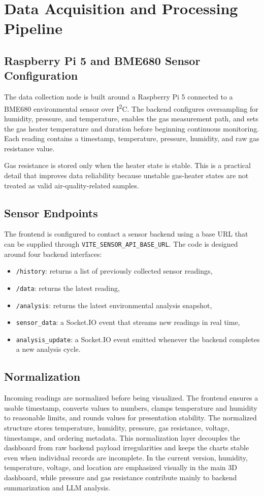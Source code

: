 \documentclass[conference]{IEEEtran}
\begin{document}
\section{Data Acquisition and Processing Pipeline}
\subsection{Raspberry Pi 5 and BME680 Sensor Configuration}
The data collection node is built around a Raspberry Pi 5 connected to a BME680 environmental sensor over I\textsuperscript{2}C. The backend configures oversampling for humidity, pressure, and temperature, enables the gas measurement path, and sets the gas heater temperature and duration before beginning continuous monitoring. Each reading contains a timestamp, temperature, pressure, humidity, and raw gas resistance value.

Gas resistance is stored only when the heater state is stable. This is a practical detail that improves data reliability because unstable gas-heater states are not treated as valid air-quality-related samples.

\subsection{Sensor Endpoints}
The frontend is configured to contact a sensor backend using a base URL that can be supplied through \texttt{VITE\_SENSOR\_API\_BASE\_URL}. The code is designed around four backend interfaces:
\begin{itemize}
\item \texttt{/history}: returns a list of previously collected sensor readings,
\item \texttt{/data}: returns the latest reading,
\item \texttt{/analysis}: returns the latest environmental analysis snapshot,
\item \texttt{sensor\_data}: a Socket.IO event that streams new readings in real time,
\item \texttt{analysis\_update}: a Socket.IO event emitted whenever the backend completes a new analysis cycle.
\end{itemize}

\subsection{Normalization}
Incoming readings are normalized before being visualized. The frontend ensures a usable timestamp, converts values to numbers, clamps temperature and humidity to reasonable limits, and rounds values for presentation stability. The normalized structure stores temperature, humidity, pressure, gas resistance, voltage, timestamps, and ordering metadata. This normalization layer decouples the dashboard from raw backend payload irregularities and keeps the charts stable even when individual records are incomplete. In the current version, humidity, temperature, voltage, and location are emphasized visually in the main 3D dashboard, while pressure and gas resistance contribute mainly to backend summarization and LLM analysis.
\end{document}
